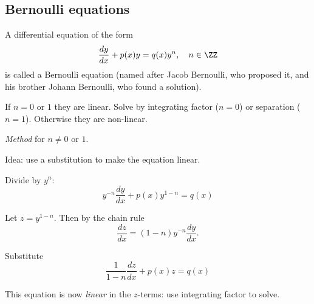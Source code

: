\subsection{Bernoulli equations}

A differential equation of the form
\[
 \dfrac{dy}{dx} + p(x)y = q(x)y^{n}, \quad n \in \ZZ
\]
is called a Bernoulli equation (named after Jacob Bernoulli, who proposed it, and his brother Johann Bernoulli, who found a solution).

If $n=0$ or $1$ they are linear. Solve by integrating factor ($n=0$) or separation ($n=1$). 
Otherwise they are non-linear.

\emph{Method} for $n\ne0$ or $1$.

Idea: use a substitution to make the equation linear.

Divide by $y^{n}$:
\[
 y^{-n} \dfrac{dy}{dx} + p(x) y^{1-n} = q(x)
\]

Let $z=y^{1-n}$.  Then by the chain rule
\[
 \dfrac{dz}{dx} = (1-n) y^{-n} \dfrac{dy}{dx} .
\]

Substitute 
\[
 \dfrac{1}{1-n} \dfrac{dz}{dx} + p(x) z= q(x)
\]

This equation is now \emph{linear} in the  $z$-terms: use integrating factor to solve.


